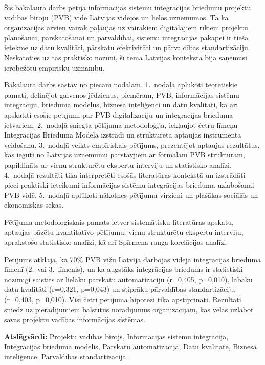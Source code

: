 \frontmatterpage
{}

Šis bakalaura darbs pētīja informācijas sistēmu integrācijas briedumu projektu
vadības biroju (PVB) vidē Latvijas vidējos un lielos uzņēmumos. Tā kā organizācijas
arvien vairāk paļaujas uz vairākiem digitālajiem rīkiem projektu plānošanai,
pārskatošanai un pārvaldībai, sistēmu integrācijas pakāpei ir tieša ietekme uz
datu kvalitāti, pārskatu efektivitāti un pārvaldības standartizāciju. Neskatoties
uz tās praktisko nozīmi, šī tēma Latvijas kontekstā bija saņēmusi ierobežotu
empīrisku uzmanību.

Bakalaura darbs sastāv no piecām nodaļām. 1.\ nodaļā aplūkoti teorētiskie pamati,
definējot galvenos jēdzienus, piemēram, PVB, informācijas sistēmu integrāciju,
brieduma modeļus, biznesa inteliģenci un datu kvalitāti, kā arī apskatīti esošie
pētījumi par PVB digitalizāciju un integrācijas brieduma ietvariem. 2.\ nodaļā
sniegta pētījuma metodoloģija, iekļaujot četru līmeņu Integrācijas Brieduma
Modeļa izstrādi un strukturēta aptaujas instrumenta veidošanu. 3.\ nodaļā veikts
empīriskais pētījums, prezentējot aptaujas rezultātus, kas iegūti no Latvijas
uzņēmumu pārstāvjiem ar formālām PVB struktūrām, papildināts ar vienu strukturētu
ekspertu interviju un statistisko analīzi. 4.\ nodaļā rezultāti tika interpretēti
esošās literatūras kontekstā un izstrādāti pieci praktiski ieteikumi informācijas
sistēmu integrācijas brieduma uzlabošanai PVB vidē. 5.\ nodaļā aplūkoti nākotnes
pētījumu virzieni un plašākas sociālās un ekonomiskās sekas.

Pētījuma metodoloģiskais pamats ietver sistemātisku literatūras apskatu,
aptaujas bāzētu kvantitatīvo pētījumu, vienu strukturētu ekspertu interviju,
aprakstošo statistisko analīzi, kā arī Spīrmena ranga korelācijas analīzi.

Pētījums atklāja, ka 70\% PVB vižu Latvijā darbojas vidējā integrācijas brieduma
līmenī (2.\ vai 3.\ līmenis), un ka augstāks integrācijas briedums ir statistiski
nozīmīgi saistīts ar lielāku pārskatu automatizāciju (r=0,405, p=0,010), labāku
datu kvalitāti (r=0,321, p=0,043) un stiprāku pārvaldības standartizāciju
(r=0,403, p=0,010). Visi četri pētījuma hipotēzi tika apstiprināti. Rezultāti
sniedz uz pierādījumiem balstītus norādījumus organizācijām, kas vēlas uzlabot
savas projektu vadības informācijas sistēmas.

\thesisscopeLV

\textbf{Atslēgvārdi:} Projektu vadības birojs, Informācijas sistēmu integrācija,
Integrācijas brieduma modelis, Pārskatu automatizācija, Datu kvalitāte,
Biznesa inteliģence, Pārvaldības standartizācija.
